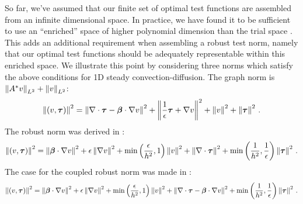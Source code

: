\documentclass{article}
\begin{document}
So far, we've assumed that our finite set of optimal test functions are assembled from an infinite dimensional space.
In practice, we have found it to be sufficient to use an ``enriched'' space of higher
polynomial dimension than the trial space \cite{PracticalDPG}.
This adds an additional requirement when assembling a robust test norm, namely that our optimal test functions should be adequately representable within this enriched space.
We illustrate this point by considering three norms which satisfy the above conditions for 1D steady convection-diffusion.
The graph norm is $\left\| A^*v \right\|_{L^2}+\left\| v \right\|_{L^2}$:
\begin{equation*}
\left\| (v,\boldsymbol\tau) \right\|^2=
\left\| \nabla\cdot\boldsymbol\tau-\boldsymbol\beta\cdot\nabla v \right\|^2
+\left\| \frac{1}{\epsilon}\boldsymbol\tau+\nabla v \right\|^2
+\left\| v \right\|^2
+\left\| \boldsymbol\tau \right\|^2\,.
\end{equation*}
The robust norm was derived in \cite{ChanHeuerThanhDemkowicz2012}:
\begin{equation*}
\left\| (v,\boldsymbol\tau) \right\|^2=
\left\| \boldsymbol\beta\cdot\nabla v \right\|^2
+\epsilon\left\| \nabla v \right\|^2
+\min\left( \frac{\epsilon}{h^2},1 \right)\left\| v \right\|^2
+\left\| \nabla\cdot\boldsymbol\tau \right\|^2
+\min\left( \frac{1}{h^2},\frac{1}{\epsilon} \right)\left\| \boldsymbol\tau \right\|^2\,.
\end{equation*}
The case for the coupled robust norm was made in \cite{JesseDissertation}:
\begin{equation*}
\left\| (v,\boldsymbol\tau) \right\|^2=
\left\| \boldsymbol\beta\cdot\nabla v \right\|^2
+\epsilon\left\| \nabla v \right\|^2
+\min\left( \frac{\epsilon}{h^2},1 \right)\left\| v \right\|^2
+\left\| \nabla\cdot\boldsymbol\tau-\boldsymbol\beta\cdot\nabla v \right\|^2
+\min\left( \frac{1}{h^2},\frac{1}{\epsilon} \right)\left\| \boldsymbol\tau \right\|^2\,.
\end{equation*}
\end{document}
